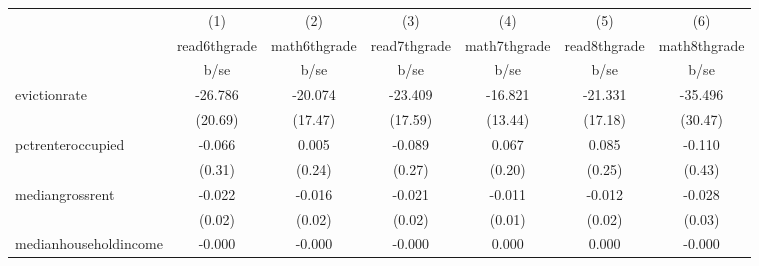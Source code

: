 {
\def\sym#1{\ifmmode^{#1}\else\(^{#1}\)\fi}
\begin{tabular}{l*{6}{c}}
\hline\hline
            &\multicolumn{1}{c}{(1)}           &\multicolumn{1}{c}{(2)}           &\multicolumn{1}{c}{(3)}           &\multicolumn{1}{c}{(4)}           &\multicolumn{1}{c}{(5)}           &\multicolumn{1}{c}{(6)}           \\
            &\multicolumn{1}{c}{read6thgrade}  &\multicolumn{1}{c}{math6thgrade}  &\multicolumn{1}{c}{read7thgrade}  &\multicolumn{1}{c}{math7thgrade}  &\multicolumn{1}{c}{read8thgrade}  &\multicolumn{1}{c}{math8thgrade}  \\
            &                     b/se         &                     b/se         &                     b/se         &                     b/se         &                     b/se         &                     b/se         \\
\hline
evictionrate&                  -26.786         &                  -20.074         &                  -23.409         &                  -16.821         &                  -21.331         &                  -35.496         \\
            &                  (20.69)         &                  (17.47)         &                  (17.59)         &                  (13.44)         &                  (17.18)         &                  (30.47)         \\
pctrenteroccupied&                   -0.066         &                    0.005         &                   -0.089         &                    0.067         &                    0.085         &                   -0.110         \\
            &                   (0.31)         &                   (0.24)         &                   (0.27)         &                   (0.20)         &                   (0.25)         &                   (0.43)         \\
mediangrossrent&                   -0.022         &                   -0.016         &                   -0.021         &                   -0.011         &                   -0.012         &                   -0.028         \\
            &                   (0.02)         &                   (0.02)         &                   (0.02)         &                   (0.01)         &                   (0.02)         &                   (0.03)         \\
medianhouseholdincome&                   -0.000         &                   -0.000         &                   -0.000         &                    0.000         &                    0.000         &                   -0.000         \\

\end{tabular}}
